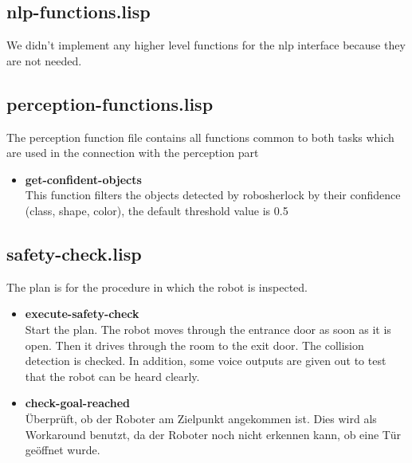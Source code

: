 \documentclass[main.tex]{subfiles}
\begin{document}
	    \subsection{nlp-functions.lisp}
	     We didn't implement any higher level functions for the nlp interface because they are not needed.
	    \subsection{perception-functions.lisp}
	    The perception function file contains all functions common to both tasks which are used in the connection with the perception part
	    \begin{itemize}
	    	\item \textbf{get-confident-objects} \\
	    	This function filters the objects detected by robosherlock by their confidence (class, shape, color), the default threshold value is 0.5
	    \end{itemize}
	    \subsection{safety-check.lisp}
	    The plan is for the procedure in which the robot is inspected. 
	    \begin{itemize}
	    	\item \textbf{execute-safety-check} \\
	    	Start the plan. The robot moves through the entrance door as soon as it is open. Then it drives through the room to the exit door. The collision detection is checked. In addition, some voice outputs are given out to test that the robot can be heard clearly.
	    	\item \textbf{check-goal-reached}\\
	    	Überprüft, ob der Roboter am Zielpunkt angekommen ist. Dies wird als Workaround benutzt, da der Roboter noch nicht erkennen kann, ob eine Tür geöffnet wurde.
	    \end{itemize}
\end{document}
